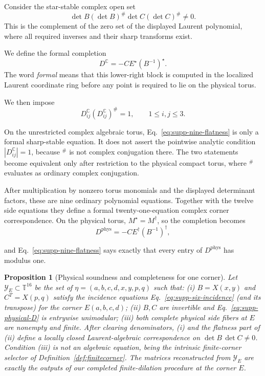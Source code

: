 \documentclass[aps,prx,reprint,nofootinbib,twoside,superscriptaddress,longbibliography,floatfix]{revtex4-2}
\newtheorem{proposition}[theorem]{Proposition}
\theoremstyle{definition}
\newcommand{\T}{\mathbb T}
\newcommand{\C}{\mathbb C}
\begin{document}
Consider the star-stable complex open set
\begin{equation}
\det B(\det B)^\#\det C(\det C)^\#\ne0.
\label{eq:supp-complex-open}
\end{equation}
This is the complement of the zero set of the displayed Laurent polynomial, where all required inverses and their sharp transforms exist.

We define the formal completion
\begin{equation}
D^{\C}=-CE^\star(B^{-1})^\star.
\label{eq:supp-D}
\end{equation}
The word \emph{formal} means that this lower-right block is computed in the localized Laurent coordinate ring before any point is required to lie on the physical torus.

We then impose
\begin{equation}
D^{\C}_{ij}(D^{\C}_{ij})^\#=1,\qquad 1\le i,j\le3.
\label{eq:supp-nine-flatness}
\end{equation}

On the unrestricted complex algebraic torus, Eq.~\eqref{eq:supp-nine-flatness} is only a formal sharp-stable equation. It does not assert the pointwise analytic condition $|D^{\C}_{ij}|=1$, because $^\#$ is not complex conjugation there. The two statements become equivalent only after restriction to the physical compact torus, where $^\#$ evaluates as ordinary complex conjugation.

After multiplication by nonzero torus monomials and the displayed determinant factors, these are nine ordinary polynomial equations. Together with the twelve side equations they define a formal twenty-one-equation complex corner correspondence. On the physical torus, $M^\star=M^\dagger$, so the completion becomes
\begin{equation}
D^{\mathrm{phys}}=-CE^\dagger(B^{-1})^\dagger,
\label{eq:supp-physical-D}
\end{equation}

and Eq.~\eqref{eq:supp-nine-flatness} says exactly that every entry of $D^{\mathrm{phys}}$ has modulus one.

\begin{proposition}[Physical soundness and completeness for one corner]
\label{prop:supp-one-corner}
Let $\mathcal Y_E\subset\T^{16}$ be the set of $\eta=(a,b,c,d,x,y,p,q)$ such that: (i) $B=X(x,y)$ and $C^T=X(p,q)$ satisfy the incidence equations Eq.~\eqref{eq:supp-six-incidence} (and its transpose) for the corner $E(a,b,c,d)$; (ii) $B,C$ are invertible and Eq.~\eqref{eq:supp-physical-D} is entrywise unimodular; (iii) both complete physical side fibers at $E$ are nonempty and finite.  {After clearing denominators, (i) and the flatness part of (ii) define a locally closed Laurent-algebraic correspondence on $\det B\,\det C\ne0$.} Condition (iii) is not an algebraic equation, being the intrinsic finite-corner selector of Definition~\ref{def:finitecorner}.  The matrices reconstructed from $\mathcal Y_E$ are exactly the outputs of our completed finite-dilation procedure at the corner $E$.
\end{proposition}
\end{document}
